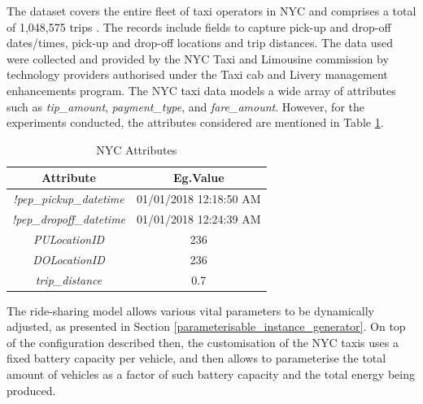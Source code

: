 The dataset covers the entire fleet of taxi operators in NYC and comprises a total of 1,048,575 trips \cite{nyc_data}. The records include fields to capture pick-up and drop-off dates/times, pick-up and drop-off locations and trip distances. The data used were collected and provided by the NYC Taxi and Limousine commission by technology providers authorised under the Taxi cab and Livery management enhancements program. The NYC taxi data models a wide array of attributes such as \textit{tip\_amount}, \textit{payment\_type}, and \textit{fare\_amount}. However, for the experiments conducted, the attributes considered are mentioned in Table \ref{tab:nyc_ex}.
\begin{table}[b]
\centering
\begin{tabular}{|c|c|}
  \hline
   \textbf{Attribute} & \textbf{Eg.Value} \\
  \hline
   \textit{!pep\_pickup\_datetime} & 01/01/2018 12:18:50 AM \\
  \hline
    \textit{!pep\_dropoff\_datetime} & 01/01/2018 12:24:39 AM \\
  \hline
   \textit{PULocationID} & 236 \\
  \hline
    \textit{DOLocationID} & 236 \\
  \hline
    \textit{trip\_distance} & 0.7 \\
  \hline
\end{tabular}
\caption{NYC Attributes}\label{tab:nyc_ex} 
\end{table}

The ride-sharing model allows various vital parameters to be dynamically adjusted, as presented in Section \ref{parameterisable_instance_generator}. 
On top of the configuration described then, the customisation of the NYC taxis uses a fixed battery capacity per vehicle, and then allows to parameterise the total amount of vehicles as a factor of such battery capacity and the total energy being produced. 

